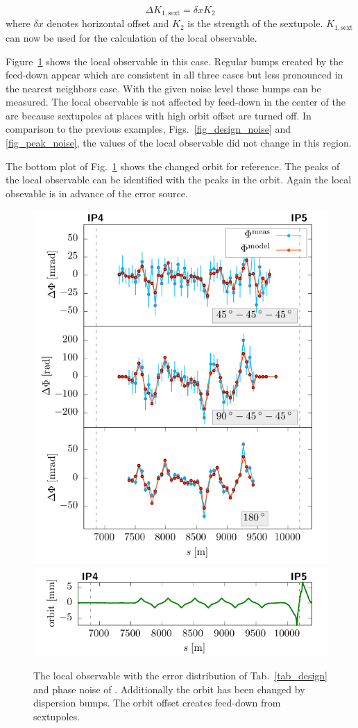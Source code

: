 \begin{equation}
  \Delta K_{1,\text{sext}} = \delta x K_2
  \label{eq_sext_fedddown}
\end{equation}
where $\delta x$ denotes horizontal offset and $K_2$ is the strength of the sextupole. $K_{1,\text{sext}}$
can now be used for the calculation of the local observable.



Figure~\ref{fig_disp_noise} shows the local observable in this case. Regular bumps created by the
feed-down appear which are consistent in all three cases but less pronounced in the nearest neighbors case.
With the given noise level those bumps can be measured.
The local observable is not affected by feed-down in the center of the arc because sextupoles at places
with high orbit offset are turned off.
In comparison to the previous examples, Figs.~\ref{fig_design_noise} and \ref{fig_peak_noise}, the
values of the local observable did not change in this region.

The bottom plot of Fig.~\ref{fig_disp_noise} shows the changed orbit for reference.
The peaks of the local observable can be identified with the peaks in the orbit.
Again the local obsevable is in 
advance of the error source.

\begin{figure}[t]
  \centering
  \includegraphics[width=.6\linewidth]{sim_disp}\\
  \includegraphics[width=.6\linewidth]{sim_orbit_x_noise_disp}
  \caption{The local observable with the error distribution of Tab.~\ref{tab_design} and phase noise
    of \noiserms. Additionally the orbit has been changed by dispersion bumps. The orbit offset creates
  feed-down from sextupoles.}
  \label{fig_disp_noise}
\end{figure}

